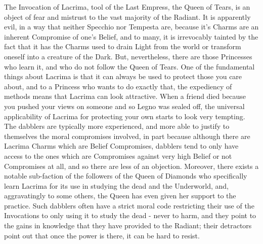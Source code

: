{The Invocation of Lacrima, tool of the Last Empress, the Queen of Tears, is an object of fear and mistrust to the vast majority of the Radiant. It is apparently evil, in a way that neither Specchio nor Tempesta are, because it's Charms are an inherent Compromise of one's Belief, and to many, it is irrevocably tainted by the fact that it has the Charms used to drain Light from the world or transform oneself into a creature of the Dark. But, nevertheless, there are those Princesses who learn it, and who do not follow the Queen of Tears. One of the fundamental things about Lacrima is that it can always be used to protect those you care about, and to a Princess who wants to do exactly that, the expediency of methods means that Lacrima can look attractive. When a friend died because you pushed your views on someone and so Legno was sealed off, the universal applicability of Lacrima for protecting your own starts to look very tempting. The dabblers are typically more experienced, and more able to justify to 
themselves the 
moral compromises involved, in part because although there are Lacrima Charms which are Belief Compromises, dabblers tend to only have access to the ones which are Compromises against very high Belief or not Compromises at all, and so there are less of an objection. Moreover, there exists a notable sub-faction of the followers of the Queen of Diamonds who specifically learn Lacrima for its use in studying the dead and the Underworld, and, aggravatingly to some others, the Queen has even given her support to the practice. Such dabblers often have a strict moral code restricting their use of the Invocations to only using it to study the dead - never to harm, and they point to the gains in knowledge that they have provided to the Radiant; their detractors point out that once the power is there, it can be hard to resist. 

}\myframe{

}
